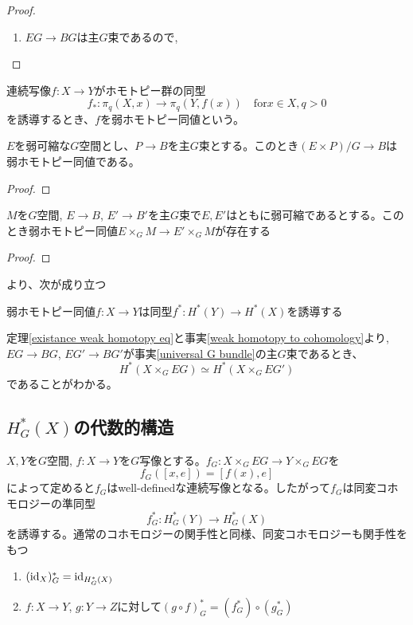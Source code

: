 \begin{proof}
  \begin{enumerate}
    \item $EG\rightarrow BG$は主$G$束であるので,
  \end{enumerate}
\end{proof}

連続写像$f\colon X\rightarrow Y$がホモトピー群の同型
\[
f_*\colon\pi_q(X, x)\rightarrow \pi_q(Y, f(x))\quad\text{for} x\in X, q>0 
\]
を誘導するとき、$f$を弱ホモトピー同値という。

\begin{lemm}
  $E$を弱可縮な$G$空間とし、$P\rightarrow B$を主$G$束とする。このとき$(E\times P)/G\rightarrow B$は弱ホモトピー同値である。
\end{lemm}

\begin{proof}
  
\end{proof}

\begin{theo}\label{existance weak homotopy eq}
  $M$を$G$空間, $E\rightarrow B$, $E'\rightarrow B'$を主$G$束で$E,E'$はともに弱可縮であるとする。このとき弱ホモトピー同値$E\times_GM\rightarrow E'\times_GM$が存在する
\end{theo}

\begin{proof}
  
\end{proof}

\cite{hatcher}より、次が成り立つ 
\begin{fact}\label{weak homotopy to cohomology}
  弱ホモトピー同値$f\colon X\rightarrow Y$は同型$f^*\colon H^*(Y)\rightarrow H^*(X)$を誘導する
\end{fact}

定理\ref{existance weak homotopy eq}と事実\ref{weak homotopy to cohomology}より, $EG\rightarrow BG$, $EG'\rightarrow BG'$が事実\ref{universal G bundle}の主$G$束であるとき、
\[
H^*(X\times_GEG)\simeq H^*(X\times_GEG')
\]
であることがわかる。

\subsection{$H^*_G(X)$の代数的構造}

$X, Y$を$G$空間, $f\colon X\rightarrow Y$を$G$写像とする。$f_G\colon X\times_GEG\rightarrow Y\times_GEG$を
\[
f_G([x, e])=[f(x), e]
\]
によって定めると$f_G$はwell-definedな連続写像となる。したがって$f_G$は同変コホモロジーの準同型
\[
f_G^*\colon H^*_G(Y)\rightarrow H^*_G(X)
\]
を誘導する。通常のコホモロジーの関手性と同様、同変コホモロジーも関手性をもつ
\begin{prop}\:
  \begin{enumerate}
    \item $(\text{id}_{X})_G^*=\text{id}_{H^*_G(X)}$
    \item $f\colon X\rightarrow Y$, $g\colon Y\rightarrow Z$に対して$(g\circ f)_G^*=(f_G^*)\circ(g_G^*)$
  \end{enumerate}
\end{prop}

